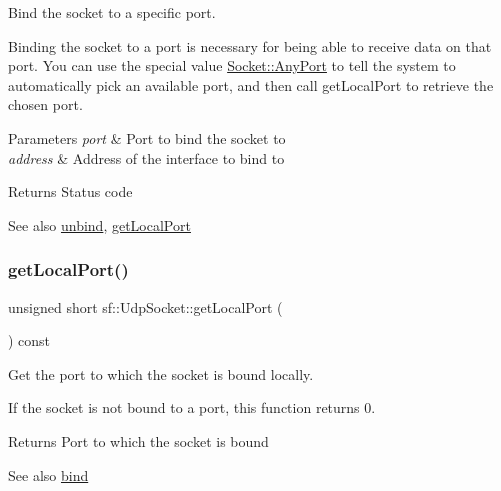 Bind the socket to a specific port. 

Binding the socket to a port is necessary for being able to receive data on that port. You can use the special value \hyperlink{classsf_1_1_socket_aca9589996f3038a260724263b12caf71a5a3c30fd128895403afc11076f461b19}{Socket\+::\+Any\+Port} to tell the system to automatically pick an available port, and then call get\+Local\+Port to retrieve the chosen port.


\begin{DoxyParams}{Parameters}
{\em port} & Port to bind the socket to \\
\hline
{\em address} & Address of the interface to bind to\\
\hline
\end{DoxyParams}
\begin{DoxyReturn}{Returns}
Status code
\end{DoxyReturn}
\begin{DoxySeeAlso}{See also}
\hyperlink{classsf_1_1_udp_socket_a2c4abb8102a1bd31f51fcfe7f15427a3}{unbind}, \hyperlink{classsf_1_1_udp_socket_a5c03644b3da34bb763bce93e758c938e}{get\+Local\+Port} 
\end{DoxySeeAlso}
\mbox{\label{classsf_1_1_udp_socket_a5c03644b3da34bb763bce93e758c938e}} 
\subsubsection{\texorpdfstring{get\+Local\+Port()}{getLocalPort()}}
{\footnotesize\ttfamily unsigned short sf\+::\+Udp\+Socket\+::get\+Local\+Port (\begin{DoxyParamCaption}{ }\end{DoxyParamCaption}) const}



Get the port to which the socket is bound locally. 

If the socket is not bound to a port, this function returns 0.

\begin{DoxyReturn}{Returns}
Port to which the socket is bound
\end{DoxyReturn}
\begin{DoxySeeAlso}{See also}
\hyperlink{classsf_1_1_udp_socket_ad764c3d06d90b4714dcc97a0d1647bcc}{bind} 
\end{DoxySeeAlso}
\mbox{\label{classsf_1_1_udp_socket_ade9ca0f7ed7919136917b0b997a9833a}} 
